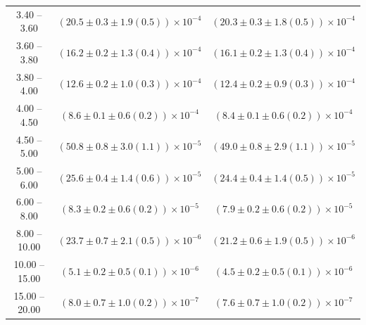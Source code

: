 \begin{table}
\begin{center}
\begin{tabular}{ c | c c }
3.40 -- 3.60 & $(20.5\pm0.3\pm1.9(0.5))\times10^{-4}$ & $(20.3\pm0.3\pm1.8(0.5))\times10^{-4}$ \\ 
3.60 -- 3.80 & $(16.2\pm0.2\pm1.3(0.4))\times10^{-4}$ & $(16.1\pm0.2\pm1.3(0.4))\times10^{-4}$ \\ 
3.80 -- 4.00 & $(12.6\pm0.2\pm1.0(0.3))\times10^{-4}$ & $(12.4\pm0.2\pm0.9(0.3))\times10^{-4}$ \\ 
4.00 -- 4.50 & $(8.6\pm0.1\pm0.6(0.2))\times10^{-4}$ & $(8.4\pm0.1\pm0.6(0.2))\times10^{-4}$ \\ 
4.50 -- 5.00 & $(50.8\pm0.8\pm3.0(1.1))\times10^{-5}$ & $(49.0\pm0.8\pm2.9(1.1))\times10^{-5}$ \\ 
5.00 -- 6.00 & $(25.6\pm0.4\pm1.4(0.6))\times10^{-5}$ & $(24.4\pm0.4\pm1.4(0.5))\times10^{-5}$ \\ 
6.00 -- 8.00 & $(8.3\pm0.2\pm0.6(0.2))\times10^{-5}$ & $(7.9\pm0.2\pm0.6(0.2))\times10^{-5}$ \\ 
8.00 -- 10.00 & $(23.7\pm0.7\pm2.1(0.5))\times10^{-6}$ & $(21.2\pm0.6\pm1.9(0.5))\times10^{-6}$ \\ 
10.00 -- 15.00 & $(5.1\pm0.2\pm0.5(0.1))\times10^{-6}$ & $(4.5\pm0.2\pm0.5(0.1))\times10^{-6}$ \\ 
15.00 -- 20.00 & $(8.0\pm0.7\pm1.0(0.2))\times10^{-7}$ & $(7.6\pm0.7\pm1.0(0.2))\times10^{-7}$ \\ 
\hline
\end{tabular}
\end{center}
\end{table}
 
